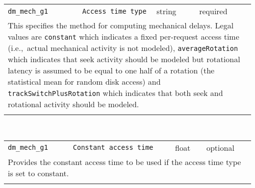 \noindent 
\begin{tabular}{|p{1.5in}|p{3.5in}|p{0.5in}|p{0.5in}|}
\cline{1-4}
\texttt{dm\_mech\_g1} & \texttt{Access time type} & string & required \\ 
\cline{1-4}
\multicolumn{4}{|p{6in}|}{
This specifies the method for computing mechanical delays. Legal values
are \texttt{constant} which indicates a fixed per-request access time
(i.e.,~actual mechanical activity is not modeled),
\texttt{averageRotation} which indicates that seek activity should be
modeled but rotational latency is assumed to be equal to one half of
a rotation (the statistical mean for random disk access) and
\texttt{trackSwitchPlusRotation} which indicates that both seek and
rotational activity should be modeled.
}\\ 
\cline{1-4}
\multicolumn{4}{p{5in}}{}\\
\end{tabular}\\ 
\noindent 
\begin{tabular}{|p{1.5in}|p{3.5in}|p{0.5in}|p{0.5in}|}
\cline{1-4}
\texttt{dm\_mech\_g1} & \texttt{Constant access time} & float & optional \\ 
\cline{1-4}
\multicolumn{4}{|p{6in}|}{
Provides the constant access time to be used if the access time type
is set to constant.
}\\ 
\cline{1-4}
\multicolumn{4}{p{5in}}{}\\
\end{tabular}\\ 
\noindent 
